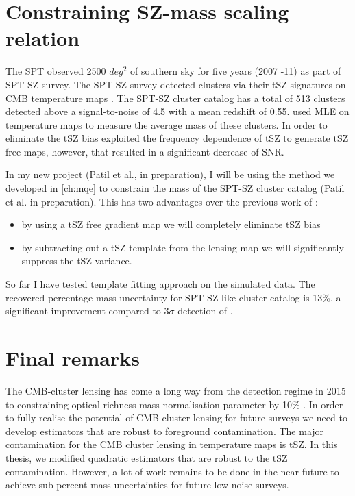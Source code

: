  
 

\section{Constraining SZ-mass scaling relation}
\label{sz_mass}
The SPT observed 2500 $deg^{2}$ of southern sky for five years (2007 -11) as part of SPT-SZ survey.
The SPT-SZ survey detected clusters via their tSZ signatures on CMB temperature maps \citep{bleem15}. The SPT-SZ cluster catalog has a total of 513 clusters detected above a signal-to-noise of 4.5 with a mean redshift of 0.55.
\citet{baxter15} used MLE on temperature maps to measure the average mass of these clusters. 
In order to eliminate the tSZ bias \citet{baxter15} exploited the frequency dependence of tSZ to generate tSZ free maps, however, that resulted in a significant decrease of SNR. 

In my new project (Patil et al., in preparation), I will be using the method we developed in  \ref{ch:mqe} to constrain the mass of the SPT-SZ cluster catalog (Patil et al. in preparation). This has two advantages over the previous work of \citet{baxter15}:
\begin{itemize}
\item by using a tSZ free gradient map we will completely eliminate tSZ bias
\item by subtracting out a tSZ template from the lensing map we will significantly suppress the tSZ variance. 
\end{itemize}
So far I have tested template fitting approach \citep{patil19} on the simulated data. The recovered percentage mass uncertainty for SPT-SZ like cluster catalog is 13\%, a significant improvement compared to $3\sigma$ detection of \citet{baxter15}.

\section{Final remarks}
\label{concluding_remarks}
The CMB-cluster lensing has come a long way from the detection regime in 2015 \citep{baxter15} to constraining optical richness-mass normalisation parameter by 10\% \citep{geach17}. 
In order to fully realise the potential of CMB-cluster lensing for future surveys we need to develop estimators that are robust to foreground contamination. 
The major contamination for the CMB cluster lensing in temperature maps is tSZ. 
In this thesis, we modified quadratic estimators that are robust to the tSZ contamination. %
However, a lot of work remains to be done in the near future to achieve sub-percent mass uncertainties for future low noise surveys.


